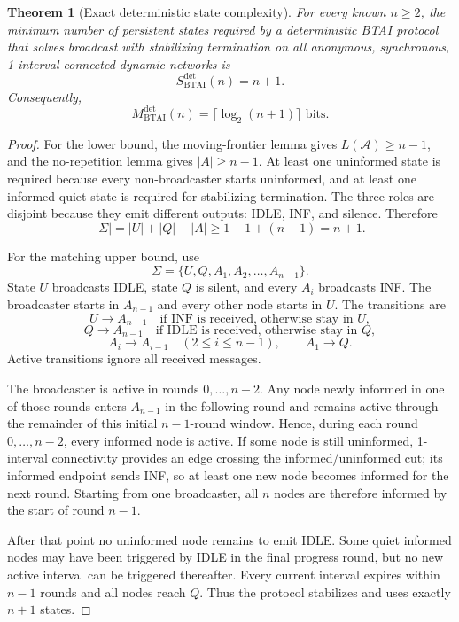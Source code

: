 \documentclass[11pt]{article}
\newtheorem{theorem}{Theorem}
\begin{document}
\begin{theorem}[Exact deterministic state complexity]
For every known $n\ge2$, the minimum number of persistent states required by a deterministic BTAI protocol that solves broadcast with stabilizing termination on all anonymous, synchronous, 1-interval-connected dynamic networks is
\[
S^{\mathrm{det}}_{\mathrm{BTAI}}(n)=n+1.
\]
Consequently,
\[
M^{\mathrm{det}}_{\mathrm{BTAI}}(n)=\lceil\log_2(n+1)\rceil\text{ bits}.
\]
\end{theorem}
\begin{proof}
For the lower bound, the moving-frontier lemma gives $L(\mathcal A)\ge n-1$, and the no-repetition lemma gives $|A|\ge n-1$. At least one uninformed state is required because every non-broadcaster starts uninformed, and at least one informed quiet state is required for stabilizing termination. The three roles are disjoint because they emit different outputs: IDLE, INF, and silence. Therefore
\[
|\Sigma|=|U|+|Q|+|A|\ge1+1+(n-1)=n+1.
\]

For the matching upper bound, use
\[
\Sigma=\{U,Q,A_1,A_2,\dots,A_{n-1}\}.
\]
State $U$ broadcasts IDLE, state $Q$ is silent, and every $A_i$ broadcasts INF. The broadcaster starts in $A_{n-1}$ and every other node starts in $U$. The transitions are
\[
U\to A_{n-1}\quad\text{if INF is received, otherwise stay in }U,
\]
\[
Q\to A_{n-1}\quad\text{if IDLE is received, otherwise stay in }Q,
\]
\[
A_i\to A_{i-1}\quad(2\le i\le n-1),\qquad A_1\to Q.
\]
Active transitions ignore all received messages.

The broadcaster is active in rounds $0,\dots,n-2$. Any node newly informed in one of those rounds enters $A_{n-1}$ in the following round and remains active through the remainder of this initial $n-1$-round window. Hence, during each round $0,\dots,n-2$, every informed node is active. If some node is still uninformed, 1-interval connectivity provides an edge crossing the informed/uninformed cut; its informed endpoint sends INF, so at least one new node becomes informed for the next round. Starting from one broadcaster, all $n$ nodes are therefore informed by the start of round $n-1$.

After that point no uninformed node remains to emit IDLE. Some quiet informed nodes may have been triggered by IDLE in the final progress round, but no new active interval can be triggered thereafter. Every current interval expires within $n-1$ rounds and all nodes reach $Q$. Thus the protocol stabilizes and uses exactly $n+1$ states.
\end{proof}
\end{document}
